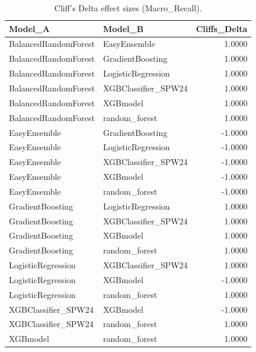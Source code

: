 \begin{table}[t]
\centering
\begin{tabular}{llr}
\toprule
Model_A & Model_B & Cliffs_Delta \\
\midrule
BalancedRandomForest & EasyEnsemble & 1.0000 \\
BalancedRandomForest & GradientBoosting & 1.0000 \\
BalancedRandomForest & LogisticRegression & 1.0000 \\
BalancedRandomForest & XGBClassifier_SPW24 & 1.0000 \\
BalancedRandomForest & XGBmodel & 1.0000 \\
BalancedRandomForest & random_forest & 1.0000 \\
EasyEnsemble & GradientBoosting & -1.0000 \\
EasyEnsemble & LogisticRegression & -1.0000 \\
EasyEnsemble & XGBClassifier_SPW24 & -1.0000 \\
EasyEnsemble & XGBmodel & -1.0000 \\
EasyEnsemble & random_forest & -1.0000 \\
GradientBoosting & LogisticRegression & 1.0000 \\
GradientBoosting & XGBClassifier_SPW24 & 1.0000 \\
GradientBoosting & XGBmodel & 1.0000 \\
GradientBoosting & random_forest & 1.0000 \\
LogisticRegression & XGBClassifier_SPW24 & 1.0000 \\
LogisticRegression & XGBmodel & -1.0000 \\
LogisticRegression & random_forest & 1.0000 \\
XGBClassifier_SPW24 & XGBmodel & -1.0000 \\
XGBClassifier_SPW24 & random_forest & 1.0000 \\
XGBmodel & random_forest & 1.0000 \\
\bottomrule
\end{tabular}
\caption{Cliff's Delta effect sizes (Macro_Recall).}
\label{tab:cliffs_Macro_Recall}
\end{table}